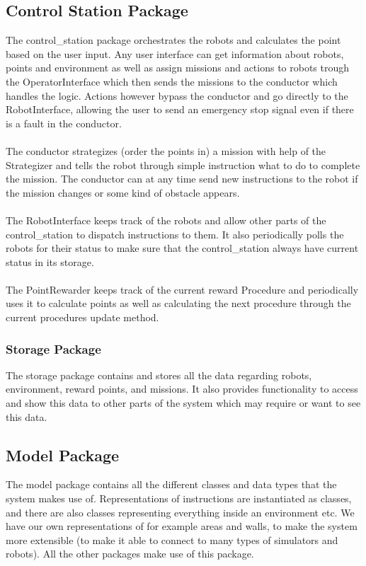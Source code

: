 \subsection{Control Station Package}
The control\_station package orchestrates the robots and calculates the point based on the user input. Any user interface can get information about robots, points and environment as well as assign missions and actions to robots trough the OperatorInterface which then sends the missions to the conductor which handles the logic. Actions however bypass the conductor and go directly to the RobotInterface, allowing the user to send an emergency stop signal even if there is a fault in the conductor.
\\ \\
The conductor strategizes (order the points in) a mission with help of the Strategizer and tells the robot through simple instruction what to do to complete the mission. The conductor can at any time send new instructions to the robot if the mission changes or some kind of obstacle appears.
\\ \\
The RobotInterface keeps track of the robots and allow other parts of the control\_station to dispatch instructions to them. It also periodically polls the robots for their status to make sure that the control\_station always have current status in its storage.
\\ \\
The PointRewarder keeps track of the current reward Procedure and periodically uses it to calculate points as well as calculating the next procedure through the current procedures update method.

\subsubsection{Storage Package}
The storage package contains and stores all the data regarding robots, environment, reward points, and missions. It also provides functionality to access and show this data to other parts of the system which may require or want to see this data.
\subsection{Model Package}
The model package contains all the different classes and data types that the system makes use of. Representations of instructions are instantiated as classes, and there are also classes representing everything inside an environment etc. We have our own representations of for example areas and walls, to make the system more extensible (to make it able to connect to many types of simulators and robots). All the other packages make use of this package.
